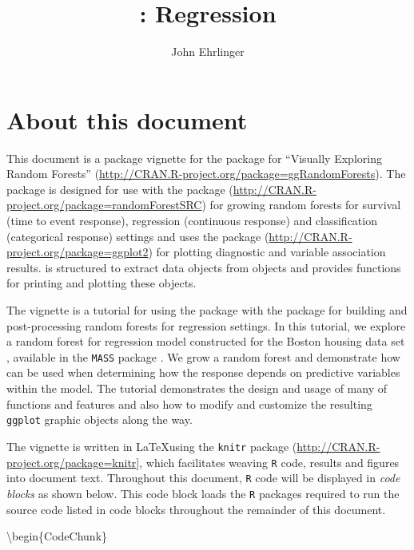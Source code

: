 \documentclass[article]{jss}
\author{
John Ehrlinger\\
}
\title{\pkg{ggRandomForests}: Regression \pkg{randomForestSRC}}
\begin{document}
\hypertarget{about-this-document}{%
\section{About this document}\label{about-this-document}}

This document is a package vignette for the 
package for ``Visually Exploring Random Forests''
(\url{http://CRAN.R-project.org/package=ggRandomForests}). The
 package is designed for use with the
 package
(\url{http://CRAN.R-project.org/package=randomForestSRC})
\citep{Ishwaran:RFSRC:2014} for growing random forests for survival
(time to event response), regression (continuous response) and
classification (categorical response) settings and uses the
 package (\url{http://CRAN.R-project.org/package=ggplot2})
\citep{Wickham:2009} for plotting diagnostic and variable association
results.  is structured to extract data objects
from  objects and provides functions for printing
and plotting these objects.

The vignette is a tutorial for using the  package
with the  package for building and post-processing
random forests for regression settings. In this tutorial, we explore a
random forest for regression model constructed for the Boston housing
data set \citep[\citet{Belsley:1980}]{Harrison:1978}, available in the
\texttt{MASS} package \citep{mass:2002}. We grow a random forest and
demonstrate how  can be used when determining how
the response depends on predictive variables within the model. The
tutorial demonstrates the design and usage of many of
 functions and features and also how to modify and
customize the resulting \texttt{ggplot} graphic objects along the way.

The vignette is written in \LaTeX using the \texttt{knitr} package
(\url{http://CRAN.R-project.org/package=knitr}{]}\citep[\citet{Xie:2014},\citet{Xie:2013}]{Xie:2015},
which facilitates weaving \texttt{R} \citep{rcore} code, results and
figures into document text. Throughout this document, \texttt{R} code
will be displayed in \emph{code blocks} as shown below. This code block
loads the \texttt{R} packages required to run the source code listed in
code blocks throughout the remainder of this document.

\textbackslash{}begin\{CodeChunk\}
\end{document}
